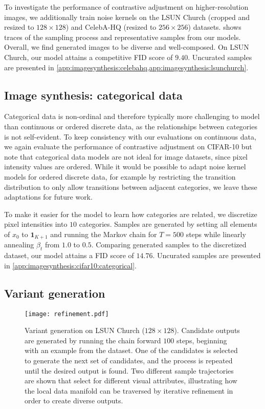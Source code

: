 \documentclass[10pt,twocolumn,letterpaper]{article}
\begin{document}
To investigate the performance of contrastive adjustment on higher-resolution images, we additionally train noise kernels on the LSUN Church (cropped and resized to $128 \times 128$) and CelebA-HQ (resized to $256 \times 256$) datasets.
 shows traces of the sampling process and representative samples from our models.
Overall, we find generated images to be diverse and well-composed.
On LSUN Church, our model attains a competitive FID score of $9.40$.
Uncurated samples are presented in \cref{app:imagesynthesis:celebahq,app:imagesynthesis:lsunchurch}.


\subsection{Image synthesis: categorical data}

Categorical data is non-ordinal and therefore typically more challenging to model than continuous or ordered discrete data, as the relationships between categories is not self-evident.
To keep consistency with our evaluations on continuous data, we again evaluate the performance of contrastive adjustment on CIFAR-10 but note that categorical data models are not ideal for image datasets, since pixel intensity values are ordered.
While it would be possible to adapt noise kernel models for ordered discrete data, for example by restricting the transition distribution to only allow transitions between adjacent categories, we leave these adaptations for future work.

To make it easier for the model to learn how categories are related, we discretize pixel intensities into $10$ categories.
Samples are generated by setting all elements of $x_{0}$ to $\mathbf{1}_{K+1}$ and running the Markov chain for $T=500$ steps while linearly annealing $\beta_{t}$ from $1.0$ to $0.5$.
Comparing generated samples to the discretized dataset, our model attains a FID score of $14.76$.
Uncurated samples are presented in \cref{app:imagesynthesis:cifar10:categorical}.


\subsection{Variant generation}

\begin{figure*}[t]
  \centering
  \texttt{[image: refinement.pdf]}\caption{Variant generation on LSUN Church ($128 \times 128$).
    Candidate outputs are generated by running the chain forward $100$ steps, beginning with an example from the dataset.
    One of the candidates is selected to generate the next set of candidates, and the process is repeated until the desired output is found.
    Two different sample trajectories are shown that select for different visual attributes, illustrating how the local data manifold can be traversed by iterative refinement in order to create diverse outputs.
  }\label{fig:variants}
\end{figure*}
\end{document}
